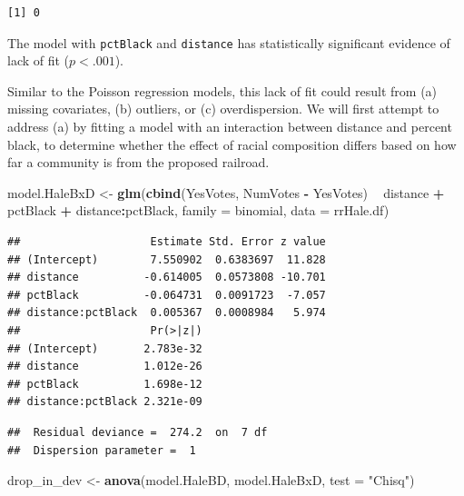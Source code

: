 \documentclass[
]{krantz}
\newenvironment{Shaded}{\begin{snugshade}}{\end{snugshade}}
\newcommand{\DataTypeTok}[1]{\textcolor[rgb]{0.27,0.27,0.27}{#1}}
\newcommand{\KeywordTok}[1]{\textcolor[rgb]{0.27,0.27,0.27}{\textbf{#1}}}
\newcommand{\NormalTok}[1]{#1}
\newcommand{\OperatorTok}[1]{\textcolor[rgb]{0.43,0.43,0.43}{\textbf{#1}}}
\newcommand{\StringTok}[1]{\textcolor[rgb]{0.5,0.5,0.5}{#1}}
\begin{document}
\begin{verbatim}
[1] 0
\end{verbatim}

The model with \texttt{pctBlack} and \texttt{distance} has statistically significant evidence of lack of fit (\(p<.001\)).

Similar to the Poisson regression models, this lack of fit  could result from (a) missing covariates, (b) outliers, or (c) overdispersion. We will first attempt to address (a) by fitting a model with an interaction between distance and percent black, to determine whether the effect of racial composition differs based on how far a community is from the proposed railroad.

\begin{Shaded}
\begin{Highlighting}[]
\NormalTok{model.HaleBxD <-}\StringTok{ }\KeywordTok{glm}\NormalTok{(}\KeywordTok{cbind}\NormalTok{(YesVotes, NumVotes }\OperatorTok{-}\StringTok{ }\NormalTok{YesVotes) }\OperatorTok{~}
\StringTok{  }\NormalTok{distance }\OperatorTok{+}\StringTok{ }\NormalTok{pctBlack }\OperatorTok{+}\StringTok{ }\NormalTok{distance}\OperatorTok{:}\NormalTok{pctBlack, }
  \DataTypeTok{family =}\NormalTok{ binomial, }\DataTypeTok{data =}\NormalTok{ rrHale.df)}
\end{Highlighting}
\end{Shaded}

\begin{verbatim}
##                    Estimate Std. Error z value
## (Intercept)        7.550902  0.6383697  11.828
## distance          -0.614005  0.0573808 -10.701
## pctBlack          -0.064731  0.0091723  -7.057
## distance:pctBlack  0.005367  0.0008984   5.974
##                    Pr(>|z|)
## (Intercept)       2.783e-32
## distance          1.012e-26
## pctBlack          1.698e-12
## distance:pctBlack 2.321e-09
\end{verbatim}

\begin{verbatim}
##  Residual deviance =  274.2  on  7 df 
##  Dispersion parameter =  1
\end{verbatim}

\begin{Shaded}
\begin{Highlighting}[]
\NormalTok{drop_in_dev <-}\StringTok{ }\KeywordTok{anova}\NormalTok{(model.HaleBD, model.HaleBxD, }
                     \DataTypeTok{test =} \StringTok{"Chisq"}\NormalTok{)}
\end{Highlighting}
\end{Shaded}
\end{document}
